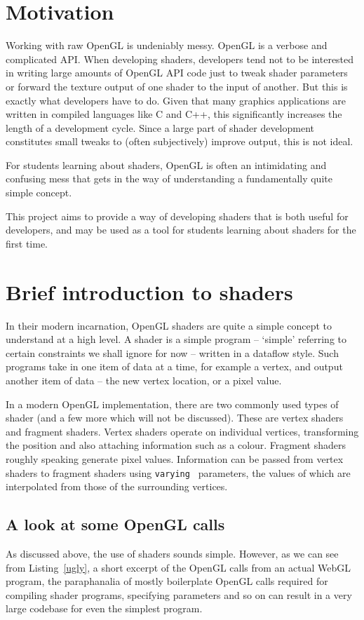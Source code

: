 \documentclass[12pt,twoside,notitlepage]{report}
\begin{document}
\section{Motivation}
Working with raw OpenGL is undeniably messy. OpenGL is a verbose and complicated API. When developing shaders, developers tend not to be interested in writing large amounts of OpenGL API code just to tweak shader parameters or forward the texture output of one shader to the input of another. But this is exactly what developers have to do. Given that many graphics applications are written in compiled languages like C and C++, this significantly increases the length of a development cycle. Since a large part of shader development constitutes small tweaks to (often subjectively) improve output, this is not ideal.

For students learning about shaders, OpenGL is often an intimidating and confusing mess that gets in the way of understanding a fundamentally quite simple concept.

This project aims to provide a way of developing shaders that is both useful for developers, and may be used as a tool for students learning about shaders for the first time.
\section{Brief introduction to shaders}
\label{brief}
In their modern incarnation, OpenGL shaders are quite a simple concept to understand at a high level. A shader is a simple program -- `simple' referring to certain constraints we shall ignore for now -- written in a dataflow style. Such programs take in one item of data at a time, for example a vertex, and output another item of data -- the new vertex location, or a pixel value.

In a modern OpenGL implementation, there are two commonly used types of shader (and a few more which will not be discussed). These are vertex shaders and fragment shaders. Vertex shaders operate on individual vertices, transforming the position and also attaching information such as a colour. Fragment shaders roughly speaking generate pixel values. Information can be passed from vertex shaders to fragment shaders using {\tt varying } parameters, the values of which are interpolated from those of the surrounding vertices.

\subsection{A look at some OpenGL calls}
As discussed above, the use of shaders sounds simple. However, as we can see from Listing~\ref{ugly}, a short excerpt of the OpenGL calls from an actual WebGL program\cite{reaction-diffusion}, the paraphanalia of mostly boilerplate OpenGL calls required for compiling shader programs, specifying parameters and so on can result in a very large codebase for even the simplest program.
\end{document}
